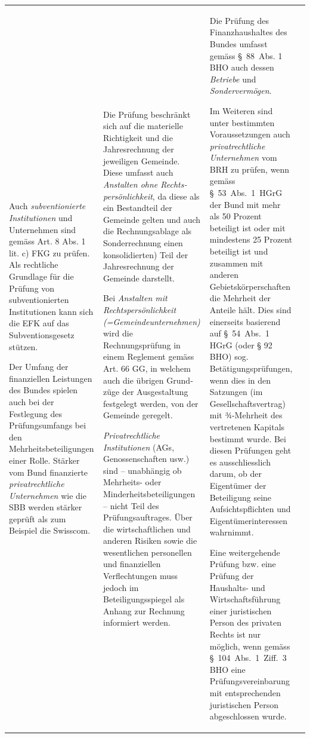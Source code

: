 \documentclass[10pt]{article}
\begin{document}
\begin{landscape}
\begin{center}
\begin{longtable}{|p{4cm}|p{5cm}|p{7.5cm}|p{7.5cm}|}
Auch \textit{subventionierte Institutionen} und Unternehmen sind gemäss Art. 8 Abs. 1 lit. c) FKG zu prüfen. Als rechtliche Grundlage für die Prüfung von subventionierten Institutionen kann sich die EFK auf das Subventionsgesetz stützen. 

Der Umfang der finanziellen Leistungen des Bundes spielen auch bei der Festlegung des Prüfungsumfangs bei den Mehrheitsbeteiligungen einer Rolle. Stärker vom Bund finanzierte \textit{privatrechtliche Unternehmen} wie die SBB werden stärker geprüft als zum Beispiel die Swisscom.

 & Die Prüfung beschränkt sich auf die materielle Richtigkeit und die Jahresrechnung der jeweiligen Gemeinde. Diese umfasst auch \textit{Anstalten ohne Rechts­persönlich­keit}, da diese als ein Bestandteil der Gemeinde gelten und auch die Rechnungs­ablage als Sonder­rechnung einen konsolidierten) Teil der Jahresrechnung der Gemeinde darstellt.

Bei \textit{Anstalten mit Rechtspersönlich­keit (=Gemeindeunternehmen)} wird die Rechnungsprüfung in einem Reglement gemäss Art. 66 GG, in welchem auch die übrigen Grund­züge der Ausgestaltung festgelegt werden, von der Gemeinde geregelt.

\textit{Privatrechtliche Institutionen} (AGs, Genossenschaften usw.) sind -- unabhängig ob Mehrheits- oder Minderheits­beteiligungen -- nicht Teil des Prüfungsauftrages. Über die wirtschaftlichen und anderen Risiken sowie die wesentlichen personellen und finanziellen Verflechtungen muss jedoch im Beteiligungsspiegel als Anhang zur Rechnung informiert werden.

 & Die Prüfung des Finanzhaushaltes des Bundes umfasst gemäss §~88~Abs. 1 BHO auch dessen \textit{Betriebe} und \textit{Sondervermögen}.

Im Weiteren sind unter bestimmten Voraussetzungen auch \textit{privatrechtliche Unternehmen} vom BRH zu prüfen, wenn gemäss §~53~Abs.~1~HGrG der Bund mit mehr als 50 Prozent beteiligt ist oder mit mind­estens 25 Prozent beteiligt ist und zusammen mit anderen Gebietskörperschaften die Mehrheit der Anteile hält. Dies sind einerseits basierend auf §~54~Abs.~1 HGrG (oder § 92 BHO) sog. Betätigungs­prüfungen, wenn dies in den Satzungen (im Gesellschafts­vertrag) mit ¾-Mehrheit des vertretenen Kapitals bestimmt wurde. Bei diesen Prüfungen geht es ausschliesslich darum, ob der Eigentümer der Beteiligung seine Aufsichts­pflichten und Eigentümer­interessen wahrnimmt.

Eine weitergehende Prüfung bzw. eine Prüfung der Haushalts- und Wirtschafts­führung einer juristischen Person des privaten Rechts ist nur möglich, wenn gemäss §~104~Abs.~1~Ziff.~3 BHO eine Prüfungsvereinbarung mit entsprechenden juristischen Person abgeschlossen wurde.


\end{longtable}
\end{center}
\end{landscape}
\end{document}
